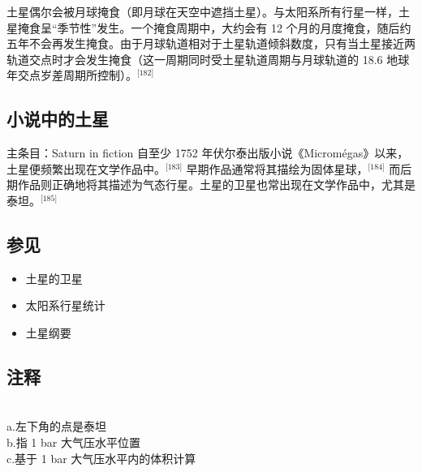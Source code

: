 土星偶尔会被月球掩食（即月球在天空中遮挡土星）。与太阳系所有行星一样，土星掩食呈“季节性”发生。一个掩食周期中，大约会有 12 个月的月度掩食，随后约五年不会再发生掩食。由于月球轨道相对于土星轨道倾斜数度，只有当土星接近两轨道交点时才会发生掩食（这一周期同时受土星轨道周期与月球轨道的 18.6 地球年交点岁差周期所控制）。\(^\text{[182]}\)
\subsection{小说中的土星}  
主条目：Saturn in fiction  
自至少 1752 年伏尔泰出版小说《Micromégas》以来，土星便频繁出现在文学作品中。\(^\text{[183]}\) 早期作品通常将其描绘为固体星球，\(^\text{[184]}\) 而后期作品则正确地将其描述为气态行星。土星的卫星也常出现在文学作品中，尤其是泰坦。\(^\text{[185]}\)
\subsection{参见} 
\begin{itemize}
\item 土星的卫星  
\item 太阳系行星统计  
\item 土星纲要
\end{itemize}  
\subsection{注释}\\ 
a.左下角的点是泰坦\\  
b.指 1 bar 大气压水平位置\\  
c.基于 1 bar 大气压水平内的体积计算













